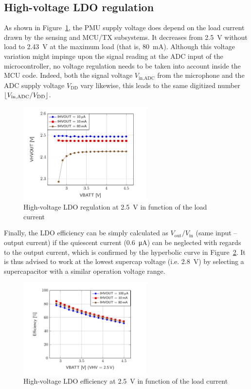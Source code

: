 \documentclass{EPL-master-thesis-covers-EN}
\newcommand{\te}[1]{\textrm{#1}}
\DeclarePairedDelimiter\floor{\lfloor}{\rfloor}
\begin{document}
\subsection*{High-voltage LDO regulation}

As shown in Figure~\ref{fig:LDO_voltage}, the PMU supply voltage does depend on the load current drawn by the sensing and MCU/TX subsystems. It decreases from \SI{2.5}{V} without load to \SI{2.43}{V} at the maximum load (that is, \SI{80}{mA}). Although this voltage variation might impinge upon the signal reading at the ADC input of the microcontroller, no voltage regulation needs to be taken into account inside the MCU code. Indeed, both the signal voltage $V_\te{in,ADC}$ from the microphone and the ADC supply voltage $V_\te{DD}$ vary likewise, this leads to the same digitized number $\floor{V_\te{in,ADC}/V_\te{DD}}$.

\begin{figure}[H]
    \centering
    \includegraphics[width=0.6\textwidth]{LDO_voltage.pdf}
    \caption{High-voltage LDO regulation at \SI{2.5}{V} in function of the load current}
    \label{fig:LDO_voltage}
\end{figure}

Finally, the LDO efficiency can be simply calculated as $V_\te{out}/V_\te{in}$ (same input -- output current) if the quiescent current (\SI{0.6}{\micro A}) can be neglected with regards to the output current, which is confirmed by the hyperbolic curve in Figure~\ref{fig:LDO_efficiency}. It is thus advised to work at the lowest supercap voltage (i.e. \SI{2.8}{V}) by selecting a supercapacitor with a similar operation voltage range.

\begin{figure}[H]
    \centering
    \includegraphics[width=0.6\textwidth]{LDO_efficiency.pdf}
    \caption{High-voltage LDO efficiency at \SI{2.5}{V} in function of the load current}
    \label{fig:LDO_efficiency}
\end{figure}
\end{document}
